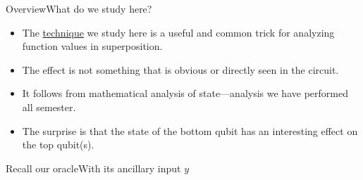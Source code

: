 
\begin{frame}{Overview}{What do we study here?}

\begin{itemize}[<+->]
   \item The \href{https://qiskit.org/textbook/ch-gates/phase-kickback.html}{technique} we study here is a useful and common trick for analyzing function values in superposition.
   \item The effect is not something that is obvious or directly seen in the circuit.
   \item It follows from mathematical analysis of state---analysis we have performed all semester.
   \item The surprise is that the state of the bottom qubit has an interesting effect on the top qubit(s).
\end{itemize}

\end{frame}

\begin{frame}{Recall our oracle}{With its ancillary input $y$}


\end{frame}

